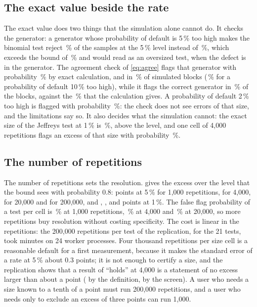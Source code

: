 \subsection{The exact value beside the rate}
\label{sec:ab-exact}

The exact value does two things that the simulation alone cannot do.
It checks the generator: a generator whose probability of default is 5\,\% too high makes the binomial test reject \agMeanRateFive\,\% of the samples at the 5\,\% level instead of \binExactFive\,\%, which exceeds the bound of \boundFive\,\% and would read as an oversized test, when the defect is in the generator.
The agreement check of \eqref{eq:agree} flags that generator with probability \agFailFivePercent\,\% by exact calculation, and in \agSimFive\,\% of \agBlocks{} simulated blocks (\agSimTen\,\% for a probability of default 10\,\% too high), while it flags the correct generator in \agSimNone\,\% of the blocks, against the \agFailOne\,\% that the calculation gives.
A probability of default 2\,\% too high is flagged with probability \agFailTwoPercent\,\%: the check does not see errors of that size, and the limitations say so.
It also decides what the simulation cannot: the exact size of the Jeffreys test at 1\,\% is \jeffExactOne\,\%, above the level, and one cell of 4,000 repetitions flags an excess of that size with probability \jeffDetect\,\%.

\subsection{The number of repetitions}
\label{sec:ab-repetitions}

The number of repetitions sets the resolution.
 gives the excess over the level that the bound sees with probability 0.8: \detFiveThousand{} points at 5\,\% for 1,000 repetitions, \detFiveFour{} for 4,000, \detFiveTwentyK{} for 20,000 and \detFiveTwoHundredK{} for 200,000, and \detOneThousand{}, \detOneFour{}, \detOneTwentyK{} and \detOneTwoHundredK{} points at 1\,\%.
The false flag probability of a test per cell is \flagThousand\,\% at 1,000 repetitions, \flagTest\,\% at 4,000 and \flagTwentyK\,\% at 20,000, so more repetitions buy resolution without costing specificity.
The cost is linear in the repetitions: the 200,000 repetitions per test of the replication, for the 21 tests, took \seedMinutes{} minutes on 24 worker processes.
Four thousand repetitions per size cell is a reasonable default for a first measurement, because it makes the standard error of a rate at 5\,\% about 0.3 points; it is not enough to certify a size, and the replication shows that a result of ``holds'' at 4,000 is a statement of no excess larger than about a point (\detIntFiveFour{} by the definition, \detFiveFour{} by the screen). A user who needs a size known to a tenth of a point must run 200,000 repetitions, and a user who needs only to exclude an excess of three points can run 1,000.
